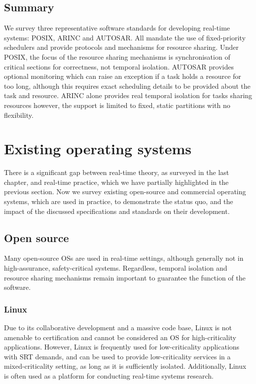 \subsection{Summary}

We survey three representative software standards for developing real-time systems: POSIX, ARINC and AUTOSAR. All mandate the use of fixed-priority schedulers 
and provide protocols and mechanisms for resource sharing. Under POSIX, 
the focus of the resource sharing mechanisms is synchronisation of critical sections for
correctness, not temporal isolation. AUTOSAR provides optional monitoring which can raise an
exception if a task holds a resource for too long, although this requires exact scheduling
details to be provided about the task and resource. ARINC alone provides real temporal isolation for
tasks sharing resources however, the support is limited to fixed, static
partitions with no flexibility.

\section{Existing operating systems}

There is a significant gap between real-time theory, as surveyed in the last chapter, and real-time
practice, which we have partially highlighted in the previous section. Now we survey existing open-source
and commercial operating systems, which are used in practice, to demonstrate the status quo, and 
the impact of the discussed specifications and standards on their development.

\subsection{Open source}

Many open-source \glspl{OS} are used in real-time settings, although generally not in
high-assurance, safety-critical systems. Regardless, temporal isolation and resource sharing mechanisms remain important to
guarantee the function of the software.

\subsubsection{Linux}

Due to its collaborative development and a massive code base, Linux is not amenable to
certification and cannot be considered an \gls{OS} for high-criticality applications. However, Linux
is frequently used for low-criticality applications with \gls{SRT} demands, and can be used to
provide low-criticality services in a mixed-criticality setting, as long as it is sufficiently
isolated. Additionally, Linux is often used as a platform for conducting real-time systems research. 

